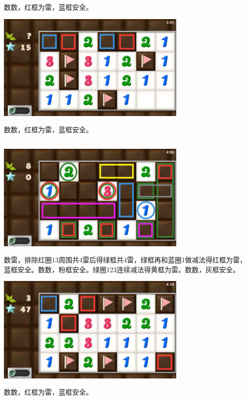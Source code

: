 数数，红框为雷，蓝框安全。
\begin{center}
    \includegraphics[width=0.7\textwidth]{puzzlelow/206-5.jpg}
\end{center}
数数，红框为雷，蓝框安全。

\subsection{} %
\begin{center}
    \includegraphics[width=0.7\textwidth]{puzzlelow/207-1.jpg}
\end{center}
数雷，排除红圈13周围共4雷后得绿框共4雷，绿框再和蓝圈1做减法得红框为雷，蓝框安全。数数，粉框安全。绿圈123连续减法得黄框为雷。数数，灰框安全。
\begin{center}
    \includegraphics[width=0.7\textwidth]{puzzlelow/207-2.jpg}
\end{center}
数数，红框为雷，蓝框安全。

